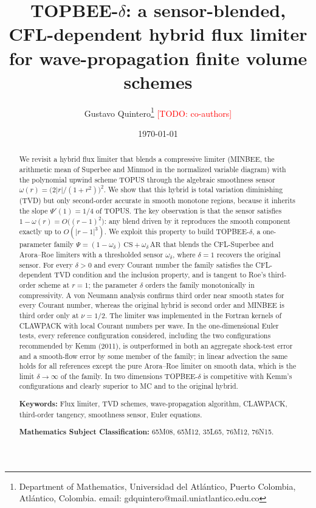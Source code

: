 \documentclass[11pt]{article}
\newcommand{\scheme}{TOPBEE-$\delta$}
\newcommand{\todo}[1]{\textcolor{red}{[TODO: #1]}}
\theoremstyle{plain}
\theoremstyle{definition}
\begin{document}
\title{\scheme: a sensor-blended, CFL-dependent hybrid flux limiter for wave-propagation finite volume schemes}

\author{
    Gustavo Quintero\thanks{Department of Mathematics, Universidad del Atl\'antico, Puerto Colombia, Atl\'antico, Colombia. email: gdquintero@mail.uniatlantico.edu.co}
    \todo{co-authors}
}

\date{\today}
\maketitle

\begin{abstract}
We revisit a hybrid flux limiter that blends a compressive limiter (MINBEE, the arithmetic mean of Superbee and Minmod in the normalized variable diagram) with the polynomial upwind scheme TOPUS through the algebraic smoothness sensor $\omega(r)=\bigl(2|r|/(1+r^2)\bigr)^2$. We show that this hybrid is total variation diminishing (TVD) but only second-order accurate in smooth monotone regions, because it inherits the slope $\Psi'(1)=1/4$ of TOPUS. The key observation is that the sensor satisfies $1-\omega(r)=O\bigl((r-1)^2\bigr)$: any blend driven by it reproduces the smooth component exactly up to $O(|r-1|^3)$. We exploit this property to build \scheme, a one-parameter family $\Psi=(1-\omega_\delta)\,\mathrm{CS}+\omega_\delta\,\mathrm{AR}$ that blends the CFL-Superbee and Arora--Roe limiters with a thresholded sensor $\omega_\delta$, where $\delta=1$ recovers the original sensor. For every $\delta>0$ and every Courant number the family satisfies the CFL-dependent TVD condition and the inclusion property, and is tangent to Roe's third-order scheme at $r=1$; the parameter $\delta$ orders the family monotonically in compressivity. A von Neumann analysis confirms third order near smooth states for every Courant number, whereas the original hybrid is second order and MINBEE is third order only at $\nu=1/2$. The limiter was implemented in the Fortran kernels of CLAWPACK with local Courant numbers per wave. In the one-dimensional Euler tests, every reference configuration considered, including the two configurations recommended by Kemm (2011), is outperformed in both an aggregate shock-test error and a smooth-flow error by some member of the family; in linear advection the same holds for all references except the pure Arora--Roe limiter on smooth data, which is the limit $\delta\to\infty$ of the family. In two dimensions \scheme{} is competitive with Kemm's configurations and clearly superior to MC and to the original hybrid.

\medskip
\noindent
\textbf{Keywords:} Flux limiter, TVD schemes, wave-propagation algorithm, CLAWPACK, third-order tangency,
smoothness sensor, Euler equations.

\medskip
\noindent
\textbf{Mathematics Subject Classification:} 65M08, 65M12, 35L65, 76M12, 76N15.
\end{abstract}
\end{document}
